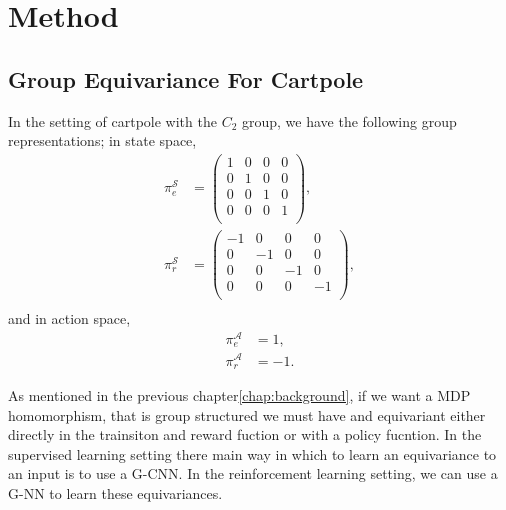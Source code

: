 \chapter{Method}\label{chap:method}
\section{Group Equivariance For Cartpole}
In the setting of cartpole with the $C_2$ group, we have the following group representations; in state space,
\begin{equation}
	\begin{aligned}
		\pi_e^{\mathcal{S}} & = \begin{pmatrix}
			                        1 & 0 & 0 & 0 \\
			                        0 & 1 & 0 & 0 \\
			                        0 & 0 & 1 & 0 \\
			                        0 & 0 & 0 & 1 \\
		                        \end{pmatrix},    \\
		\pi_r^{\mathcal{S}} & = \begin{pmatrix}
			                        -1 & 0  & 0  & 0  \\
			                        0  & -1 & 0  & 0  \\
			                        0  & 0  & -1 & 0  \\
			                        0  & 0  & 0  & -1 \\
		                        \end{pmatrix}, \\
	\end{aligned}
\end{equation}
and in action space,
\begin{equation}
	\begin{aligned}
		\pi_e^{\mathcal{A}} & = 1,  \\
		\pi_r^{\mathcal{A}} & = -1.
	\end{aligned}
\end{equation}

As mentioned in the previous chapter\ref{chap:background}, if we want a MDP homomorphism, that is group structured we must have and equivariant either directly in the trainsiton and reward fuction or with a policy fucntion. In the supervised learning setting there main way in which to learn an equivariance to an input is to use a G-CNN. In the reinforcement learning setting, we can use a G-NN to learn these equivariances.

